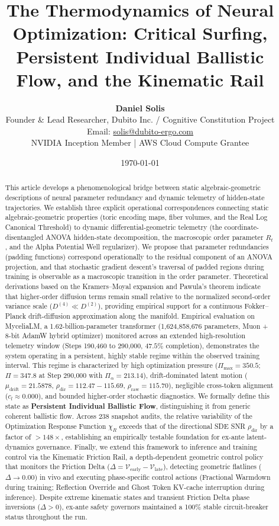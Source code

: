 \documentclass[11pt]{article}
\title{\textbf{The Thermodynamics of Neural Optimization: Critical Surfing, Persistent Individual Ballistic Flow, and the Kinematic Rail}}
\author{\textbf{Daniel Solis} \\ \small Founder \& Lead Researcher, Dubito Inc. / Cognitive Constitution Project \\ \small Email: \href{mailto:solis@dubito-ergo.com}{solis@dubito-ergo.com} \\ \small NVIDIA Inception Member | AWS Cloud Compute Grantee}
\date{\today}
\begin{document}
\maketitle

\begin{abstract}
This article develops a phenomenological bridge between static algebraic-geometric descriptions of neural parameter redundancy and dynamic telemetry of hidden-state trajectories. We establish three explicit operational correspondences connecting static algebraic-geometric properties (toric encoding maps, fiber volumes, and the Real Log Canonical Threshold) to dynamic differential-geometric telemetry (the coordinate-disentangled ANOVA hidden-state decomposition, the macroscopic order parameter $R_t$, and the Alpha Potential Well regularizer). We propose that parameter redundancies (padding functions) correspond operationally to the residual component of an ANOVA projection, and that stochastic gradient descent's traversal of padded regions during training is observable as a macroscopic transition in the order parameter. Theoretical derivations based on the Kramers--Moyal expansion and Pawula's theorem indicate that higher-order diffusion terms remain small relative to the normalized second-order variance scale ($D^{(4)} \ll D^{(2)}$), providing empirical support for a continuous Fokker--Planck drift-diffusion approximation along the manifold. Empirical evaluation on MyceliaLM, a 1.62-billion-parameter transformer (1,624,858,676 parameters, Muon + 8-bit AdamW hybrid optimizer) monitored across an extended high-resolution telemetry window (Steps 190,460 to 290,000, $47.5\%$ completion), demonstrates the system operating in a persistent, highly stable regime within the observed training interval. This regime is characterized by high optimization pressure ($\Pi_{\max} = \mathbf{350.5}$; $\Pi = 347.8$ at Step 290,000 with $\Pi_\alpha = 213.14$), drift-dominated latent motion ($\mu_{\text{drift}} = 21.5878$, $\rho_{\text{dir}} = 112.47 - 115.69$, $\rho_{\text{raw}} = 115.70$), negligible cross-token alignment ($c_l \approx 0.000$), and bounded higher-order stochastic diagnostics. We formally define this state as \textbf{Persistent Individual Ballistic Flow}, distinguishing it from generic coherent ballistic flow. Across 238 snapshot audits, the relative variability of the Optimization Response Function $\chi_R$ exceeds that of the directional SDE SNR $\rho_{\text{dir}}$ by a factor of $>148\times$, establishing an empirically testable foundation for ex-ante latent-dynamics governance. Finally, we extend this framework to inference and training control via the Kinematic Friction Rail, a depth-dependent geometric control policy that monitors the Friction Delta ($\Delta = \mathcal{V}_{\text{early}} - \mathcal{V}_{\text{late}}$), detecting geometric flatlines ($\Delta \to 0.00$) in vivo and executing phase-specific control actions (Fractional Warmdown during training; Reflection Override and Ghost Token KV-cache interruption during inference). Despite extreme kinematic states and transient Friction Delta phase inversions ($\Delta > 0$), ex-ante safety governors maintained a 100\% stable circuit-breaker status throughout the run.
\end{abstract}
\end{document}
